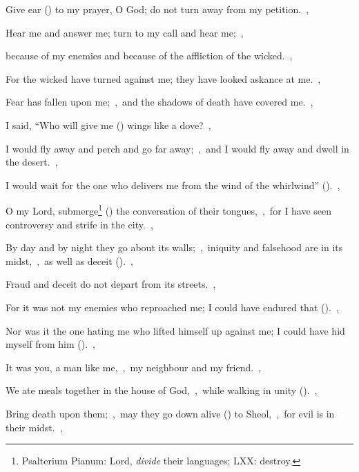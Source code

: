 \documentclass[12pt,twoside,a5paper]{article}
\begin{document}

\begin{normalparskip}
  Give ear () to my prayer, O God; do not turn away from my petition.~\sep

  Hear me and answer me; turn to my call and hear me;~\sep


  because of my enemies and because of the affliction of the wicked.~\sep

  For the wicked have turned against me; they have looked askance at me.~\sep

  Fear has fallen upon me;~\sep\ and the shadows of death have covered me.~\sep

  I said, ``Who will give me () wings like a dove?~\sep

  I would fly away and perch and go far away;~\sep\ and I would fly away and dwell in the desert.~\sep

  I would wait for the one who delivers me from the wind of the whirlwind'' ().~\sep

  O my Lord, submerge\footnote{Psalterium Pianum: Lord, \emph{divide} their languages; LXX: destroy.} () the conversation of their tongues,~\sep\ for I have seen controversy and strife in the city.~\sep

  By day and by night they go about its walls;~\sep\ iniquity and falsehood are in its midst,~\sep\ as well as deceit ().~\sep

  Fraud and deceit do not depart from its streets.~\sep

  For it was not my enemies who reproached me; I could have endured that ().~\sep

  Nor was it the one hating me who lifted himself up against me; I could have hid myself from him ().~\sep

  It was you, a man like me,~\sep\ my neighbour and my friend.~\sep

  We ate meals together in the house of God,~\sep\ while walking in unity ().~\sep

  Bring death upon them;~\sep\ may they go down alive () to Sheol,~\sep\ for evil is in their midst.~\sep


\end{normalparskip}
\end{document}
